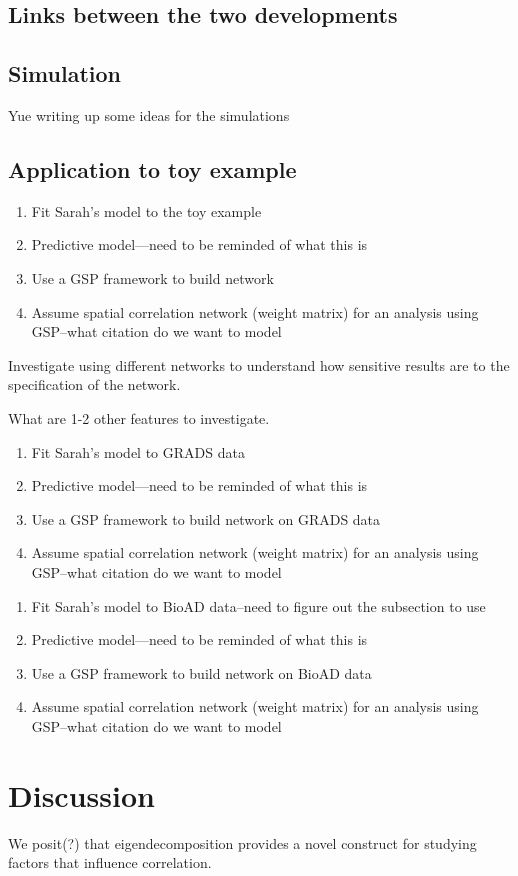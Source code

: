 \documentclass[12pt]{article}
\begin{document}
\subsection{Links between the two developments}

\subsection{Simulation}
Yue writing up some ideas for the simulations

\subsection{Application to toy example}
\begin{enumerate}
\item{Fit Sarah's model to the toy example}
\item{Predictive model---need to be reminded of what this is}
\item{Use a GSP framework to build network}
\item{Assume spatial correlation network (weight matrix) for an analysis using GSP--what citation do we want to model}
\end{enumerate}

Investigate using different networks to understand how sensitive results are to the specification of the network.

What are 1-2 other features to investigate.

\begin{enumerate}
\item{Fit Sarah's model to GRADS data}
\item{Predictive model---need to be reminded of what this is}
\item{Use a GSP framework to build network on GRADS data}
\item{Assume spatial correlation network (weight matrix) for an analysis using GSP--what citation do we want to model}
\end{enumerate}

\begin{enumerate}
\item{Fit Sarah's model to BioAD data--need to figure out the subsection to use}
\item{Predictive model---need to be reminded of what this is}
\item{Use a GSP framework to build network on BioAD data}
\item{Assume spatial correlation network (weight matrix) for an analysis using GSP--what citation do we want to model}
\end{enumerate}

\section{Discussion}
We posit(?) that eigendecomposition provides a novel construct for studying factors that influence correlation.
\end{document}
